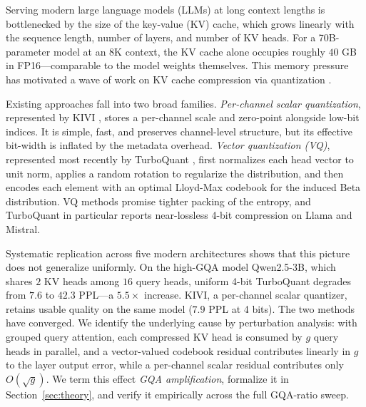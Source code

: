 \documentclass[11pt]{article}
\begin{document}
Serving modern large language models (LLMs) at long context lengths is bottlenecked by the size of the key-value (KV) cache, which grows linearly with the sequence length, number of layers, and number of KV heads. For a 70B-parameter model at an 8K context, the KV cache alone occupies roughly $40$ GB in FP16---comparable to the model weights themselves. This memory pressure has motivated a wave of work on KV cache compression via quantization \cite{kivi2024,polarquant2024,kvquant2024,turboquant2026}.

Existing approaches fall into two broad families. \emph{Per-channel scalar quantization}, represented by KIVI \cite{kivi2024}, stores a per-channel scale and zero-point alongside low-bit indices. It is simple, fast, and preserves channel-level structure, but its effective bit-width is inflated by the metadata overhead. \emph{Vector quantization (VQ)}, represented most recently by TurboQuant \cite{turboquant2026}, first normalizes each head vector to unit norm, applies a random rotation to regularize the distribution, and then encodes each element with an optimal Lloyd-Max codebook for the induced Beta distribution. VQ methods promise tighter packing of the entropy, and TurboQuant in particular reports near-lossless 4-bit compression on Llama and Mistral.

Systematic replication across five modern architectures shows that this picture does not generalize uniformly. On the high-GQA model Qwen2.5-3B, which shares $2$ KV heads among $16$ query heads, uniform 4-bit TurboQuant degrades from $7.6$ to $42.3$ PPL---a $5.5\times$ increase. KIVI, a per-channel scalar quantizer, retains usable quality on the same model ($7.9$ PPL at 4 bits). The two methods have converged. We identify the underlying cause by perturbation analysis: with grouped query attention, each compressed KV head is consumed by $g$ query heads in parallel, and a vector-valued codebook residual contributes linearly in $g$ to the layer output error, while a per-channel scalar residual contributes only $O(\sqrt{g})$. We term this effect \emph{GQA amplification}, formalize it in Section~\ref{sec:theory}, and verify it empirically across the full GQA-ratio sweep.
\end{document}
